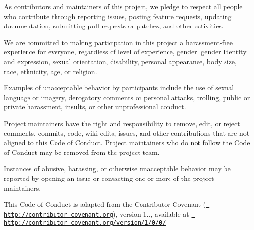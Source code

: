 As contributors and maintainers of this project, we pledge to respect all people who contribute through reporting issues, posting feature requests, updating documentation, submitting pull requests or patches, and other activities.

We are committed to making participation in this project a harassment-\/free experience for everyone, regardless of level of experience, gender, gender identity and expression, sexual orientation, disability, personal appearance, body size, race, ethnicity, age, or religion.

Examples of unacceptable behavior by participants include the use of sexual language or imagery, derogatory comments or personal attacks, trolling, public or private harassment, insults, or other unprofessional conduct.

Project maintainers have the right and responsibility to remove, edit, or reject comments, commits, code, wiki edits, issues, and other contributions that are not aligned to this Code of Conduct. Project maintainers who do not follow the Code of Conduct may be removed from the project team.

Instances of abusive, harassing, or otherwise unacceptable behavior may be reported by opening an issue or contacting one or more of the project maintainers.

This Code of Conduct is adapted from the Contributor Covenant (\href{http://contributor-covenant.org}{\texttt{ http\+://contributor-\/covenant.\+org}}), version 1.., available at \href{http://contributor-covenant.org/version/1/0/0/}{\texttt{ http\+://contributor-\/covenant.\+org/version/1/0/0/}} 